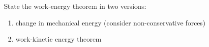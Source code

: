 

\vspace*{\fill}
\centering

State the work-energy theorem in two versions:
\begin{enumerate}
    \item change in mechanical energy (consider non-conservative forces)
    \item work-kinetic energy theorem
\end{enumerate}

\centering
\vspace*{\fill}

